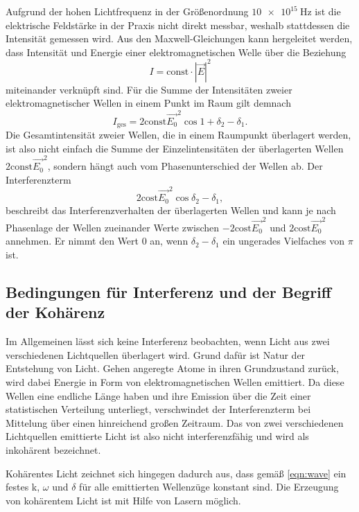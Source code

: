 Aufgrund der hohen Lichtfrequenz in der Größenordnung $\SI{10e15}{\hertz}$ ist die elektrische Feldstärke in der Praxis
nicht direkt messbar, weshalb stattdessen die Intensität gemessen wird. Aus den Maxwell-Gleichungen kann hergeleitet 
werden, dass Intensität und Energie einer elektromagnetischen Welle über die Beziehung 
\begin{equation}
    I = \text{const} \cdot |\vec{E}|^2
\end{equation}
miteinander verknüpft sind. Für die Summe der Intensitäten zweier elektromagnetischer Wellen in einem Punkt im Raum
gilt demnach
\begin{equation}
    I_\text{ges} = 2 \text{const} \vec{E_0}^2 \cos{1 + \delta_2 - \delta_1}.
\end{equation}
Die Gesamtintensität zweier Wellen, die in einem Raumpunkt überlagert werden, ist also nicht einfach die Summe der Einzelintensitäten der 
überlagerten Wellen $2 \text{const} \vec{E_0}^2$, sondern hängt auch vom Phasenunterschied der Wellen ab. 
Der Interferenzterm
\begin{equation}
    2 \text{cost} \vec{E_0}^2 \cos{\delta_2 - \delta_1},
\end{equation}
beschreibt das Interferenzverhalten der überlagerten Wellen und kann je nach Phasenlage der Wellen zueinander Werte 
zwischen $ -2 \text{cost} \vec{E_0}^2$ und $2 \text{cost} \vec{E_0}^2$ annehmen. 
Er nimmt den Wert 0 an, wenn $\delta_2 - \delta_1$ ein ungerades Vielfaches von $\pi$ ist. 

\subsection{Bedingungen für Interferenz und der Begriff der Kohärenz}
\label{ssec:kohärenz}

Im Allgemeinen lässt sich keine Interferenz beobachten, wenn Licht aus zwei verschiedenen Lichtquellen überlagert wird.
Grund dafür ist Natur der Entstehung von Licht. Gehen angeregte Atome in ihren Grundzustand zurück, wird dabei Energie in 
Form von elektromagnetischen Wellen emittiert. Da diese Wellen eine endliche Länge haben und ihre Emission über die Zeit
einer statistischen Verteilung unterliegt, verschwindet der Interferenzterm bei Mittelung über einen hinreichend großen 
Zeitraum. Das von zwei verschiedenen Lichtquellen emittierte Licht ist also nicht interferenzfähig und wird als
inkohärent bezeichnet. 

Kohärentes Licht zeichnet sich hingegen dadurch aus, dass gemäß \autoref{eqn:wave} ein festes k, $\omega$ und $\delta$ für alle emittierten Wellenzüge
konstant sind. Die Erzeugung von kohärentem Licht ist mit Hilfe von Lasern möglich. 


